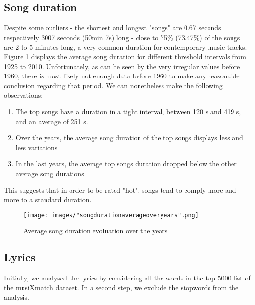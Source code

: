 \documentclass[11pt]{article}
\renewcommand\_{\textunderscore\allowbreak}
\begin{document}
\subsection{Song duration}
Despite some outliers - the shortest and longest "songs" are 0.67 seconds respectively 3007 seconds (50min 7s) long - close to 75\% (73.47\%) of the songs are 2 to 5 minutes long, a very common duration for contemporary music tracks.
Figure \ref{fig:song_duration_over_years} displays the average song duration for different threshold intervals from 1925 to 2010. 
Unfortunately, as can be seen by the very irregular values before 1960, there is most likely not enough data before 1960 to make any reasonable conclusion regarding that period. 
We can nonetheless make the following observations:
\begin{enumerate}
\itemsep 0mm
\item The top songs have a duration in a tight interval, between 120 s and 419 s, and an average of 251 s.
\item Over the years, the average song duration of the top songs displays less and less variations
\item In the last years, the average top songs duration dropped below the other average song durations
\end{enumerate}
This suggests that in order to be rated "hot", songs tend to comply more and more to a standard duration.

\begin{figure}[h!]
\centering
\captionsetup{width=1.0\textwidth}
\texttt{[image: images/"song\_duration\_average\_over\_years".png]}
\caption{Average song duration evoluation over the years}
\label{fig:song_duration_over_years}
\end{figure}


 	
\subsection{Lyrics}
Initially, we analysed the lyrics by considering all the words in the top-5000 list of the musiXmatch dataset. In a second step, we exclude the stopwords from the analysis.
\end{document}
